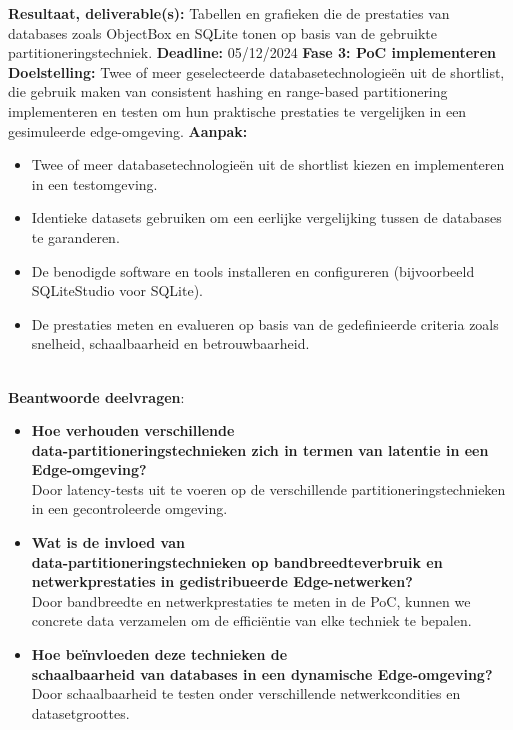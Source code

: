     \textbf{Resultaat, deliverable(s):} Tabellen en grafieken die de prestaties van databases zoals ObjectBox en SQLite tonen op basis van de gebruikte partitioneringstechniek.\newline\newline
    \textbf{Deadline:} 05/12/2024\newline\newline
\textbf{Fase 3: PoC implementeren}\newline\newline
    \textbf{Doelstelling:} Twee of meer geselecteerde databasetechnologieën uit de shortlist, die gebruik maken van consistent hashing en range-based partitionering implementeren en testen om hun praktische prestaties te vergelijken in een gesimuleerde edge-omgeving.\newline\newline
    \textbf{Aanpak:}
    \begin{itemize}
        \item Twee of meer databasetechnologieën uit de shortlist kiezen en implementeren in een testomgeving.
        \item Identieke datasets gebruiken om een eerlijke vergelijking tussen de databases te garanderen.
        \item De benodigde software en tools installeren en configureren (bijvoorbeeld SQLiteStudio voor SQLite).
        \item De prestaties meten en evalueren op basis van de gedefinieerde criteria zoals snelheid, schaalbaarheid en betrouwbaarheid.\\ \\
    \end{itemize}
    \textbf{Beantwoorde deelvragen}:
    \begin{itemize}
    \item \textbf{Hoe verhouden verschillende \vspace{0em}\\ data-partitioneringstechnieken zich in termen van latentie in een Edge-omgeving?} \\
      Door latency-tests uit te voeren op de verschillende partitioneringstechnieken in een gecontroleerde omgeving.
    \item \textbf{Wat is de invloed van \vspace{0em}\\ data-partitioneringstechnieken op bandbreedteverbruik en netwerkprestaties in gedistribueerde Edge-netwerken?} \\
      Door bandbreedte en netwerkprestaties te meten in de PoC, kunnen we concrete data verzamelen om de efficiëntie van elke techniek te bepalen.
    \item \textbf{Hoe beïnvloeden deze technieken de \vspace{0em}\\ schaalbaarheid van databases in een dynamische Edge-omgeving?} \\
      Door schaalbaarheid te testen onder verschillende netwerkcondities en datasetgroottes.
    \end{itemize}
